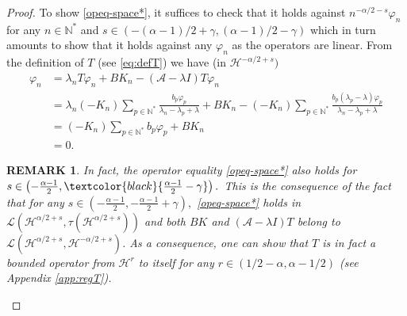 \documentclass[11pt, dvipsnames]{amsart}
\newtheorem{rmk}[theorem]{REMARK}
\begin{document}
\begin{proof}
    To show \eqref{opeq-space*}, it suffices to check that it holds against $n^{-\alpha/2-s}\varphi_n$ for any $n\in \mathbb{N}^*$ and $s\in (-(\alpha-1)/2+\gamma,(\alpha-1)/2-\gamma)$ which in turn amounts to show that it holds against any $\varphi_n$ as the operators are linear. From the definition of $T$ (see \eqref{eq:defT}) we have (in $\mathcal{H}^{-\alpha/2+s})$
    \begin{align*}
        [T\mathcal{A}+BK-(\mathcal{A}-\lambda I)T]\varphi_n&=\lambda_n T\varphi_n+BK_n-(\mathcal{A}-\lambda I)T\varphi_n\\
        &=\lambda_n (-K_n)\sum_{p\in \mathbb{N}^*}\frac{b_p\varphi_p}{\lambda_n-\lambda_p+\lambda}+BK_n-(-K_n)\sum_{p\in \mathbb{N}^*}\frac{b_p(\lambda_p-\lambda)\varphi_p}{\lambda_n-\lambda_p+\lambda}\\
        &=(-K_n)\sum_{p\in \mathbb{N}^*}b_p\varphi_p+BK_n\\
        &=0.
    \end{align*}


\begin{rmk}
\label{rmk:extension}
    In fact, the operator equality \eqref{opeq-space*} also holds for $s\in\left(-\frac{\alpha-1}{2}, \textcolor{black}{\frac{\alpha-1}{2}-\gamma}\right).$ This is the consequence of the fact that for any $s\in\left(-\frac{\alpha-1}{2}, -\frac{\alpha-1}{2}+\gamma\right),$  \eqref{opeq-space*} holds in $\mathcal{L}(\mathcal{H}^{\alpha/2+s},\tau(\mathcal{H}^{\alpha/2+s}))$ and both $BK$ and $(\mathcal{A}-\lambda I)T$ belong to $\mathcal{L}(\mathcal{H}^{\alpha/2+s},\mathcal{H}^{-\alpha/2+s})$. As a consequence, one can show that $T$ is in fact a bounded operator from $\mathcal{H}^{r}$ to itself for any $r\in(1/2-\alpha,\alpha-1/2)$ (see Appendix \ref{app:regT}).
\end{rmk}
\end{proof}
\end{document}
